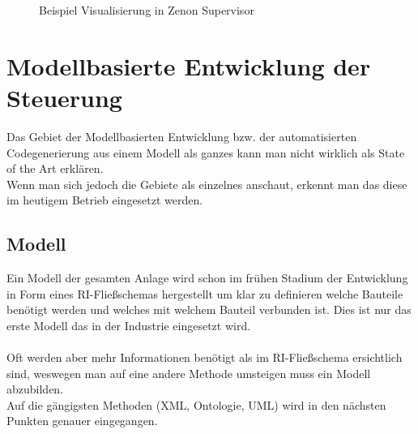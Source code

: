 \begin{figure}[hbt!]
 \centering
	\caption{Beispiel Visualisierung in Zenon Supervisor}
\end{figure}


\newpage

\section{Modellbasierte Entwicklung der Steuerung} \label{modellbasierte_entwicklung}
Das Gebiet der Modellbasierten Entwicklung bzw. der automatisierten Codegenerierung aus einem Modell als ganzes kann man nicht wirklich als State of the Art erklären.\\

Wenn man sich jedoch die Gebiete als einzelnes anschaut, erkennt man das diese im heutigem Betrieb eingesetzt werden.
\subsection{Modell}
Ein Modell der gesamten Anlage wird schon im frühen Stadium der Entwicklung in Form eines RI-Fließschemas hergestellt um klar zu definieren welche Bauteile benötigt werden und welches mit welchem Bauteil verbunden ist. Dies ist nur das erste Modell das in der Industrie eingesetzt wird.\\
\\
Oft werden aber mehr Informationen benötigt als im RI-Fließschema ersichtlich sind, weswegen man auf eine andere Methode umsteigen muss ein Modell abzubilden.\\
Auf die gängigsten Methoden (XML, Ontologie, UML) wird in den nächsten Punkten genauer eingegangen.
